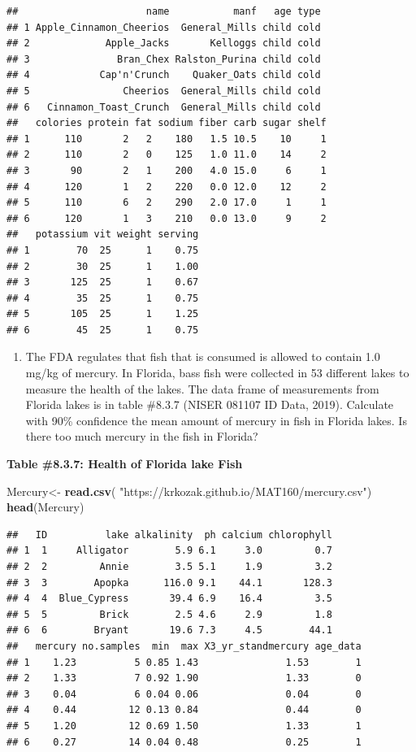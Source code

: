 \documentclass[
]{book}
\newenvironment{Shaded}{\begin{snugshade}}{\end{snugshade}}
\newcommand{\KeywordTok}[1]{\textcolor[rgb]{0.13,0.29,0.53}{\textbf{#1}}}
\newcommand{\NormalTok}[1]{#1}
\newcommand{\StringTok}[1]{\textcolor[rgb]{0.31,0.60,0.02}{#1}}
\providecommand{\tightlist}{%
  \setlength{\itemsep}{0pt}\setlength{\parskip}{0pt}}
\begin{document}
\begin{verbatim}
##                      name           manf   age type
## 1 Apple_Cinnamon_Cheerios  General_Mills child cold
## 2             Apple_Jacks       Kelloggs child cold
## 3               Bran_Chex Ralston_Purina child cold
## 4            Cap'n'Crunch    Quaker_Oats child cold
## 5                Cheerios  General_Mills child cold
## 6   Cinnamon_Toast_Crunch  General_Mills child cold
##   colories protein fat sodium fiber carb sugar shelf
## 1      110       2   2    180   1.5 10.5    10     1
## 2      110       2   0    125   1.0 11.0    14     2
## 3       90       2   1    200   4.0 15.0     6     1
## 4      120       1   2    220   0.0 12.0    12     2
## 5      110       6   2    290   2.0 17.0     1     1
## 6      120       1   3    210   0.0 13.0     9     2
##   potassium vit weight serving
## 1        70  25      1    0.75
## 2        30  25      1    1.00
## 3       125  25      1    0.67
## 4        35  25      1    0.75
## 5       105  25      1    1.25
## 6        45  25      1    0.75
\end{verbatim}

\begin{enumerate}
\def\labelenumi{\arabic{enumi}.}
\setcounter{enumi}{2}
\tightlist
\item
  The FDA regulates that fish that is consumed is allowed to contain 1.0 mg/kg of mercury. In Florida, bass fish were collected in 53 different lakes to measure the health of the lakes. The data frame of measurements from Florida lakes is in table \#8.3.7 (NISER 081107 ID Data, 2019). Calculate with 90\% confidence the mean amount of mercury in fish in Florida lakes. Is there too much mercury in the fish in Florida?
\end{enumerate}

\textbf{Table \#8.3.7: Health of Florida lake Fish}

\begin{Shaded}
\begin{Highlighting}[]
\NormalTok{Mercury<-}\StringTok{ }\KeywordTok{read.csv}\NormalTok{(}
  \StringTok{"https://krkozak.github.io/MAT160/mercury.csv"}\NormalTok{)}
\KeywordTok{head}\NormalTok{(Mercury)}
\end{Highlighting}
\end{Shaded}

\begin{verbatim}
##   ID          lake alkalinity  ph calcium chlorophyll
## 1  1     Alligator        5.9 6.1     3.0         0.7
## 2  2         Annie        3.5 5.1     1.9         3.2
## 3  3        Apopka      116.0 9.1    44.1       128.3
## 4  4  Blue_Cypress       39.4 6.9    16.4         3.5
## 5  5         Brick        2.5 4.6     2.9         1.8
## 6  6        Bryant       19.6 7.3     4.5        44.1
##   mercury no.samples  min  max X3_yr_standmercury age_data
## 1    1.23          5 0.85 1.43               1.53        1
## 2    1.33          7 0.92 1.90               1.33        0
## 3    0.04          6 0.04 0.06               0.04        0
## 4    0.44         12 0.13 0.84               0.44        0
## 5    1.20         12 0.69 1.50               1.33        1
## 6    0.27         14 0.04 0.48               0.25        1
\end{verbatim}
\end{document}
